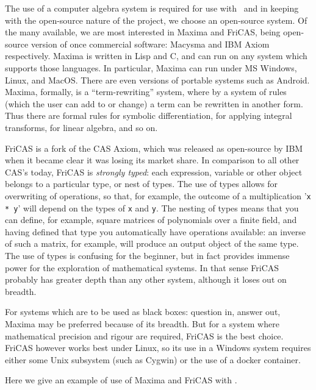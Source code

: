 \documentclass[11pt]{article}
\begin{document}
\vspace{8mm}


The use of a computer algebra system is required for use with \ketcindy\, and in
keeping with the open-source nature of the project, we choose an open-source
system.  Of the many available, we are most interested in Maxima and FriCAS,
being open-source version of once commercial software: Macysma and IBM Axiom
respectively.  Maxima is written in Lisp and C, and can run on any system which
supports those languages.  In particular, Maxima can run under MS Windows,
Linux, and MacOS.  There are even versions of portable systems such as Android.
Maxima, formally, is a ``term-rewriting'' system, where by a system of rules
(which the user can add to or change) a term can be rewritten in another form.
Thus there are formal rules for symbolic differentiation, for applying integral
transforms, for linear algebra, and so on.

FriCAS is a fork of the CAS Axiom, which was released as open-source by IBM when
it became clear it was losing its market share.  In comparison to all other
CAS's today, FriCAS is\emph{ strongly typed}: each expression, variable or other
object belongs to a particular type, or nest of types.  The use of types allows
for overwriting of operations, so that, for example, the outcome of a
multiplication '\texttt{x * y}' will depend on the types of \texttt{x} and
\texttt{y}.  The nesting of types means that you can define, for example, square
matrices of polynomials over a finite field, and having defined that type you
automatically have operations available: an inverse of such a matrix, for
example, will produce an output object of the same type.  The use of types is
confusing for the beginner, but in fact provides immense power for the
exploration of mathematical systems.  In that sense FriCAS probably has greater
depth than any other system, although it loses out on breadth.  

For systems which are to be used as black boxes: question in, answer out, Maxima
may be preferred because of its breadth.  But for a system where mathematical
precision and rigour are required, FriCAS is the best choice.  FriCAS however works
best under Linux, so its use in a Windows system requires either some Unix
subsystem (such as Cygwin) or the use of a docker container.  

Here we give an example of use of Maxima and FriCAS
with \ketcindy.\vspace{-2mm}
\end{document}
